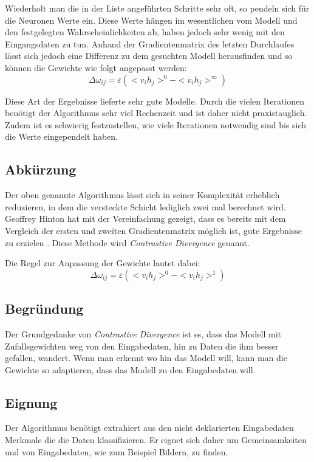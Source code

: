 Wiederholt man die in der Liste angeführten Schritte sehr oft, so pendeln sich für die Neuronen Werte ein. Diese Werte hängen im wesentlichen vom Modell und den festgelegten Wahrscheinlichkeiten ab, haben jedoch sehr wenig mit den Eingangsdaten zu tun. Anhand der Gradientenmatrix des letzten Durchlaufes lässt sich jedoch eine Differenz zu dem gesuchten Modell herausfinden und so können die Gewichte wie folgt angepasst werden:
$$\Delta\omega_{ij} = \varepsilon (<v_ih_j>^0 -  <v_ih_j>^\infty)$$

Diese Art der Ergebnisse lieferte sehr gute Modelle. Durch die vielen Iterationen benötigt der Algorithmus sehr viel Rechenzeit und ist daher nicht praxistauglich. Zudem ist es schwierig festzustellen, wie viele Iterationen notwendig sind bis sich die Werte eingependelt haben.

\subsection{Abkürzung}

Der oben genannte Algorithmus lässt sich in seiner Komplexität erheblich reduzieren, in dem die versteckte Schicht lediglich zwei mal berechnet wird. Geoffrey Hinton hat mit der Vereinfachung gezeigt, dass es bereits mit dem Vergleich der ersten und zweiten Gradientenmatrix möglich ist, gute Ergebnisse zu erzielen \citep{ContrustiveDivergence}. Diese Methode wird \emph{Contrastive Divergence} genannt.

Die Regel zur Anpassung der Gewichte lautet dabei:
$$\Delta\omega_{ij} = \varepsilon (<v_ih_j>^0 -  <v_ih_j>^1)$$

\subsection{Begründung}

Der Grundgedanke von \emph{Contrastive Divergence} ist es, dass das Modell mit Zufallsgewichten weg von den Eingabedaten, hin zu Daten die ihm besser gefallen, wandert. Wenn man erkennt wo hin das Modell will, kann man die Gewichte so adaptieren, dass das Modell zu den Eingabedaten will.

\subsection{Eignung}

Der Algorithmus benötigt extrahiert aus den nicht deklarierten Eingabedaten Merkmale die die Daten klassifizieren. Er eignet sich daher um Gemeinsamkeiten und von Eingabedaten, wie zum Beispiel Bildern, zu finden.

